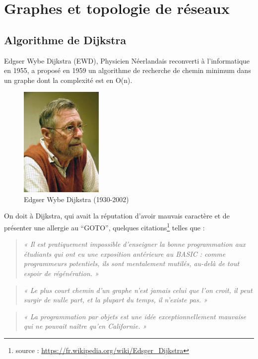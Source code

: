 \chapter{Graphes et topologie de réseaux}
\label{chap:premierchapitre}

\section{Algorithme de Dijkstra}
Edgser Wybe Dijkstra (EWD), Physicien Néerlandais reconverti à l'informatique en 1955, a proposé en 1959 un algorithme de recherche de chemin minimum 
dans un graphe  dont  la complexité est en O(n). 

\begin{figure}[htp]
  \centering
  \includegraphics[width=4cm]{images/Edsger_Wybe_Dijkstra}
  \caption{Edgser Wybe Dijkstra (1930-2002)}
  \label{fig:une-autre-image}
\end{figure}

On doit à Dijkstra, qui avait la réputation d'avoir mauvais caractère et de présenter une allergie au ``GOTO'',
quelques citations\footnote{source : \url{https://fr.wikipedia.org/wiki/Edsger_Dijkstra}} telles que :


\begin{quote}
\textit{« Il est pratiquement impossible d'enseigner la bonne programmation aux étudiants 
qui ont eu une exposition antérieure au BASIC : comme programmeurs potentiels, 
ils sont mentalement mutilés, au-delà de tout espoir de régénération. »}
\end{quote}

\begin{quote}
\textit{« Le plus court chemin d'un graphe n'est jamais celui que l'on croit, 
il peut surgir de nulle part, et la plupart du temps, il n'existe pas. »}
\end{quote}

\begin{quote}
\textit{« La programmation par objets est une idée exceptionnellement mauvaise qui ne pouvait naître qu'en Californie. »}
\end{quote}



